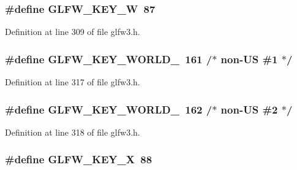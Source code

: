 \subsubsection[{G\+L\+F\+W\+\_\+\+K\+E\+Y\+\_\+\+W}]{\setlength{\rightskip}{0pt plus 5cm}\#define G\+L\+F\+W\+\_\+\+K\+E\+Y\+\_\+\+W~87}\label{group__keys_gaa06a712e6202661fc03da5bdb7b6e545}


Definition at line 309 of file glfw3.\+h.

\hypertarget{group__keys_gadc78dad3dab76bcd4b5c20114052577a}{}
\subsubsection[{G\+L\+F\+W\+\_\+\+K\+E\+Y\+\_\+\+W\+O\+R\+L\+D\+\_\+1}]{\setlength{\rightskip}{0pt plus 5cm}\#define G\+L\+F\+W\+\_\+\+K\+E\+Y\+\_\+\+W\+O\+R\+L\+D\+\_~161 /$\ast$ non-\/U\+S \#1 $\ast$/}\label{group__keys_gadc78dad3dab76bcd4b5c20114052577a}


Definition at line 317 of file glfw3.\+h.

\hypertarget{group__keys_ga20494bfebf0bb4fc9503afca18ab2c5e}{}
\subsubsection[{G\+L\+F\+W\+\_\+\+K\+E\+Y\+\_\+\+W\+O\+R\+L\+D\+\_\+2}]{\setlength{\rightskip}{0pt plus 5cm}\#define G\+L\+F\+W\+\_\+\+K\+E\+Y\+\_\+\+W\+O\+R\+L\+D\+\_~162 /$\ast$ non-\/U\+S \#2 $\ast$/}\label{group__keys_ga20494bfebf0bb4fc9503afca18ab2c5e}


Definition at line 318 of file glfw3.\+h.

\hypertarget{group__keys_gac1c42c0bf4192cea713c55598b06b744}{}
\subsubsection[{G\+L\+F\+W\+\_\+\+K\+E\+Y\+\_\+\+X}]{\setlength{\rightskip}{0pt plus 5cm}\#define G\+L\+F\+W\+\_\+\+K\+E\+Y\+\_\+\+X~88}\label{group__keys_gac1c42c0bf4192cea713c55598b06b744}


